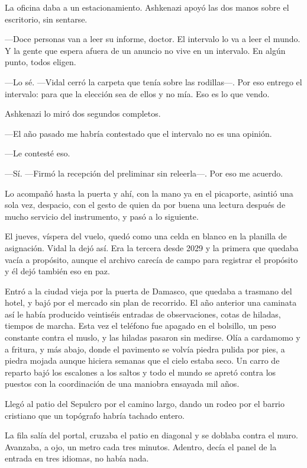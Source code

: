 La oficina daba a un estacionamiento. Ashkenazi apoyó las dos manos sobre el escritorio, sin sentarse.

---Doce personas van a leer su informe, doctor. El intervalo lo va a leer el mundo. Y la gente que espera afuera de un anuncio no vive en un intervalo. En algún punto, todos eligen.

---Lo sé. ---Vidal cerró la carpeta que tenía sobre las rodillas---. Por eso entrego el intervalo: para que la elección sea de ellos y no mía. Eso es lo que vendo.

Ashkenazi lo miró dos segundos completos.

---El año pasado me habría contestado que el intervalo no es una opinión.

---Le contesté eso.

---Sí. ---Firmó la recepción del preliminar sin releerla---. Por eso me acuerdo.

Lo acompañó hasta la puerta y ahí, con la mano ya en el picaporte, asintió una sola vez, despacio, con el gesto de quien da por buena una lectura después de mucho servicio del instrumento, y pasó a lo siguiente.


\scenebreak


El jueves, víspera del vuelo, quedó como una celda en blanco en la planilla de asignación. Vidal la dejó así. Era la tercera desde 2029 y la primera que quedaba vacía a propósito, aunque el archivo carecía de campo para registrar el propósito y él dejó también eso en paz.

Entró a la ciudad vieja por la puerta de Damasco, que quedaba a trasmano del hotel, y bajó por el mercado sin plan de recorrido. El año anterior una caminata así le había producido veintiséis entradas de observaciones, cotas de hiladas, tiempos de marcha. Esta vez el teléfono fue apagado en el bolsillo, un peso constante contra el muslo, y las hiladas pasaron sin medirse. Olía a cardamomo y a fritura, y más abajo, donde el pavimento se volvía piedra pulida por pies, a piedra mojada aunque hiciera semanas que el cielo estaba seco. Un carro de reparto bajó los escalones a los saltos y todo el mundo se apretó contra los puestos con la coordinación de una maniobra ensayada mil años.

Llegó al patio del Sepulcro por el camino largo, dando un rodeo por el barrio cristiano que un topógrafo habría tachado entero.

La fila salía del portal, cruzaba el patio en diagonal y se doblaba contra el muro. Avanzaba, a ojo, un metro cada tres minutos. Adentro, decía el panel de la entrada en tres idiomas, no había nada.


